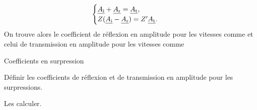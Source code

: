 \documentclass[12pt,fancy]{cours}%
\begin{document}
\begin{equation}
\begin{cases}
\underline{A_{\rm{i}}}+\underline{A_{\rm{r}}}=\underline{A_{\rm{t}}},\\
Z(\underline{A_{\rm{i}}}-\underline{A_{\rm{r}}})=Z'\underline{A_{\rm{t}}}.
\end{cases}
\end{equation}
On trouve alors le coefficient de réflexion en amplitude pour les vitesses comme
et celui de transmission en amplitude pour les vitesses comme
\begin{exemple}{Coefficients en surpression}
  \begin{quest}
    \item	Définir les coefficients de réflexion et de transmission en amplitude pour les surpressions.
    \item Les calculer.
  \end{quest}
\end{exemple}

\end{document}
